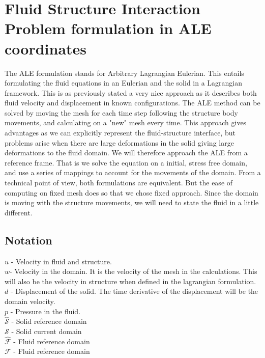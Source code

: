 

\section*{Fluid Structure Interaction Problem formulation in ALE coordinates}
The ALE formulation stands for Arbitrary Lagrangian Eulerian. This entails formulating the fluid equations in an Eulerian and the solid in a Lagrangian framework. This is as previously stated a very nice approach as it describes both fluid velocity and displacement in known configurations. The ALE method can be solved by moving the mesh for each time step following the structure body movements, and calculating on a "new" mesh every time. This approach gives advantages as we can explicitly represent the fluid-structure interface, but problems arise when there are large deformations in the solid giving large deformations to the fluid domain. We will therefore approach the ALE from a reference frame. That is we solve the equation on a initial, stress free domain, and use a series of mappings to account for the movements of the domain. From a technical point of view, both formulations are equivalent. But the ease of computing on fixed mesh does so that we chose fixed approach. \newline
Since the domain is moving with the structure movements, we will need to state the fluid in a little different.        

\subsection*{Notation}
$u$ - Velocity in fluid and structure. \\
$w$- Velocity in the domain. It is the velocity of the mesh in the calculations. This will also be the velocity in structure when defined in the lagrangian formulation. \\
$d$ - Displacement of the solid. The time derivative of the displacement will be the domain velocity. \\
$p$ - Pressure in the fluid. \\
$\hat{\mathcal{S}}$ - Solid reference domain  \\
$\mathcal{S}$ - Solid current domain  \\
$ \hat{\mathcal{F}}$ - Fluid reference domain \\
$ \mathcal{F} $ - Fluid reference domain \\


